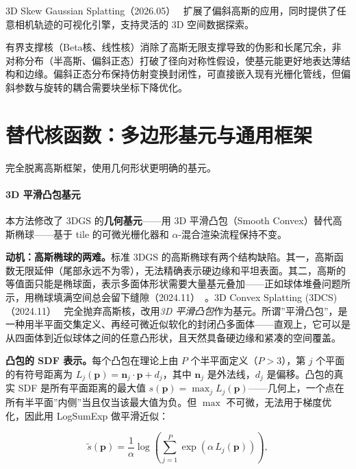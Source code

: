 3D Skew Gaussian Splatting（2026.05）~\cite{2605_18334} 扩展了偏斜高斯的应用，同时提供了任意相机轨迹的可视化引擎，支持灵活的 3D 空间数据探索。

\begin{takeaway}
有界支撑核（Beta核、线性核）消除了高斯无限支撑导致的伪影和长尾冗余，非对称分布（半高斯、偏斜正态）打破了径向对称性假设，使基元能更好地表达薄结构和边缘。偏斜正态分布保持仿射变换封闭性，可直接嵌入现有光栅化管线，但偏斜参数与旋转的耦合需要块坐标下降优化。
\end{takeaway}

\section{替代核函数：多边形基元与通用框架}
\label{sec:03_4}

完全脱离高斯框架，使用几何形状更明确的基元。

\paragraph{3D 平滑凸包基元}

本方法修改了 3DGS 的\textbf{几何基元}——用 3D 平滑凸包（Smooth Convex）替代高斯椭球——基于 tile 的可微光栅化器和 $\alpha$-混合渲染流程保持不变。

\textbf{动机：高斯椭球的两难。}标准 3DGS 的高斯椭球有两个结构缺陷。其一，高斯函数无限延伸（尾部永远不为零），无法精确表示硬边缘和平坦表面。其二，高斯的等值面只能是椭球面，表示多面体形状需要大量基元叠加——正如球体堆叠问题所示，用椭球填满空间总会留下缝隙（2024.11）~\cite{2411_14974}。3D Convex Splatting (3DCS)（2024.11）~\cite{2411_14974} 完全抛弃高斯核，改用\emph{3D 平滑凸包}作为基元。所谓”平滑凸包”，是一种用半平面交集定义、再经可微近似软化的封闭凸多面体——直观上，它可以是从四面体到近似球体之间的任意凸形状，且天然具备硬边缘和紧凑的空间覆盖。

\textbf{凸包的 SDF 表示。}每个凸包在理论上由 $P$ 个半平面定义（$P > 3$），第 $j$ 个平面的有符号距离为 $L_j(\mathbf{p}) = \mathbf{n}_j \cdot \mathbf{p} + d_j$，其中 $\mathbf{n}_j$ 是外法线，$d_j$ 是偏移。凸包的真实 SDF 是所有平面距离的最大值 $s(\mathbf{p}) = \max_j L_j(\mathbf{p})$——几何上，一个点在所有半平面”内侧”当且仅当该最大值为负。但 $\max$ 不可微，无法用于梯度优化，因此用 LogSumExp 做平滑近似：

\begin{equation}
\tilde{s}(\mathbf{p}) = \frac{1}{\alpha} \log\!\left(\sum_{j=1}^{P} \exp(\alpha \, L_j(\mathbf{p}))\right),
\end{equation}

